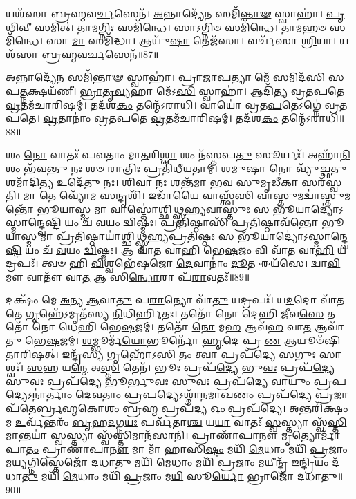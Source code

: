𑌯𑌶᳴𑌸𑌾 𑌬𑍍𑌰𑌹𑍍𑌮𑌵\-\ul{𑌰𑍍𑌚}\-𑌸𑍇𑌨᳴। 
\-\ul{𑌅}\-𑌨𑍍𑌨𑌾𑌦𑍍𑌯𑍇᳴\-\ul{𑌨} 𑌸𑌮𑌿᳴\-\ul{𑌨𑍍𑌤𑌾}\-\-\ul{𑍟} 𑌸𑍍𑌵𑌾𑌹𑌾॑। 
\-\ul{𑌪𑍃}\-\-\ul{𑌥𑌿}\-𑌵𑍀 \ul{𑌸}\-𑌮𑌿𑌤𑍍। 
𑌤𑌾\-\ul{𑌮}\-𑌗𑍍𑌨𑌿𑌃 𑌸𑌮𑌿᳴𑌨𑍍𑌧𑍇। 
𑌸𑌾𑌽𑌗𑍍𑌨𑌿𑍞 𑌸𑌮𑌿᳴𑌨𑍍𑌧𑍇। 
𑌤𑌾\-\ul{𑌮}\-𑌹𑍞 𑌸𑌮𑌿᳴𑌨𑍍𑌧𑍇। 
𑌸𑌾 \ul{𑌮𑌾} 𑌸𑌮𑌿᳴𑌦𑍍𑌧𑌾। 
𑌆𑌯𑍁᳴\-\ul{𑌷𑌾} 𑌤𑍇𑌜᳴𑌸𑌾। 
𑌵𑌰𑍍𑌚᳴𑌸𑌾 \ul{𑌶𑍍𑌰𑌿}\-𑌯𑌾। 
𑌯𑌶᳴𑌸𑌾 𑌬𑍍𑌰𑌹𑍍𑌮𑌵\-\ul{𑌰𑍍𑌚}\-𑌸𑍇𑌨᳴॥87॥

\-\ul{𑌅}\-𑌨𑍍𑌨𑌾𑌦𑍍𑌯𑍇᳴\-\ul{𑌨} 𑌸𑌮𑌿᳴\-\ul{𑌨𑍍𑌤𑌾}\-\-\ul{𑍟} 𑌸𑍍𑌵𑌾𑌹𑌾॑। 
\-\ul{𑌪𑍍𑌰𑌾}\-\-\ul{𑌜𑌾}\-\-\ul{𑌪}\-𑌤𑍍𑌯𑌾 𑌮𑍇᳴ \ul{𑌸}\-𑌮𑌿𑌦᳴𑌸𑌿 𑌸𑌪\-\ul{𑌤𑍍𑌨}\-𑌕𑍍𑌷𑌯᳴𑌣𑍀। 
\-\ul{𑌭𑍍𑌰𑌾}\-\-\ul{𑌤𑍃}\-\-\ul{𑌵𑍍𑌯}\-𑌹𑌾 𑌮𑍇᳴𑌽\-\ul{𑌸𑌿} 𑌸𑍍𑌵𑌾𑌹𑌾॑। 
𑌆𑌦𑌿᳴𑌤𑍍𑌯 𑌵𑍍𑌰𑌤𑌪𑌤𑍇 \ul{𑌵𑍍𑌰}\-𑌤𑌮᳴𑌚𑌾𑌰𑌿𑌷𑌮𑍍। 
𑌤𑌦᳴𑌶\-\ul{𑌕𑌂} 𑌤𑌨𑍍𑌮𑍇᳴𑌽𑌰𑌾𑌧𑌿। 
𑌵𑌾𑌯𑍋॑ 𑌵𑍍𑌰𑌤\-\ul{𑌪}\-𑌤𑍇𑌽𑌗𑍍𑌨𑍇॑ 𑌵𑍍𑌰𑌤𑌪𑌤𑍇। 
\-\ul{𑌵𑍍𑌰}\-𑌤𑌾𑌨𑌾𑌂॑ 𑌵𑍍𑌰𑌤𑌪𑌤𑍇 \ul{𑌵𑍍𑌰}\-𑌤𑌮᳴𑌚𑌾𑌰𑌿𑌷𑌮𑍍। 
𑌤𑌦᳴𑌶\-\ul{𑌕𑌂} 𑌤𑌨𑍍𑌮𑍇᳴𑌽𑌰𑌾𑌧𑌿॥88॥
\anuvakamend[\-\ul{𑌸}\-𑌮𑌿𑌥𑍍𑌸𑌮𑌿᳴𑌨𑍍𑌧𑍇 \ul{𑌵𑍍𑌰}\-𑌤𑌂 𑌚᳴𑌰𑌿\-\ul{𑌷𑍍𑌯𑌾}\-𑌮𑍍𑌯𑌾𑌯𑍁᳴\-\ul{𑌷𑌾} 𑌤𑍇𑌜᳴\-\ul{𑌸𑌾} 𑌵𑌰𑍍𑌚᳴𑌸𑌾 \ul{𑌶𑍍𑌰𑌿}\-𑌯𑌾 𑌯𑌶᳴𑌸𑌾 𑌬𑍍𑌰𑌹𑍍𑌮𑌵\-\ul{𑌰𑍍𑌚}\-𑌸𑍇\-\ul{𑌨𑌾}\-𑌷𑍍𑌟𑍗 𑌚᳴]


𑌶𑌂 \ul{𑌨𑍋} 𑌵𑌾𑌤𑌃᳴ 𑌪𑌵𑌤𑌾𑌂 𑌮𑌾\-\ul{𑌤}\-𑌰𑌿\-\ul{𑌶𑍍𑌵𑌾} 𑌶𑌂 𑌨᳴𑌸𑍍𑌤𑌪\-\ul{𑌤𑍁} 𑌸𑍂𑌰𑍍𑌯𑌃᳴। 
𑌅𑌹𑌾᳴\-\ul{𑌨𑌿}\-𑌶𑌂 𑌭᳴𑌵𑌨𑍍𑌤𑍁 \ul{𑌨𑌃} 𑌶𑍞 𑌰𑌾\-\ul{𑌤𑍍𑌰𑌿𑌃} 𑌪𑍍𑌰𑌤𑌿᳴𑌧𑍀𑌯𑌤𑌾𑌮𑍍। 
𑌶\-\ul{𑌮𑍁}\-𑌷𑌾 \ul{𑌨𑍋} 𑌵𑍍𑌯𑍁᳴𑌚𑍍𑌛\-\ul{𑌤𑍁} 𑌶𑌮𑌾᳴\-\ul{𑌦𑌿}\-𑌤𑍍𑌯 𑌉𑌦𑍇᳴𑌤𑍁 𑌨𑌃। 
\-\ul{𑌶𑌿}\-𑌵𑌾 \ul{𑌨𑌃} 𑌶𑌨𑍍𑌤᳴𑌮𑌾 𑌭𑌵 𑌸𑍁𑌮𑍃\-\ul{𑌡𑍀}\-𑌕𑌾 𑌸𑌰᳴𑌸𑍍𑌵𑌤𑌿। 
𑌮𑌾 \ul{𑌤𑍇} 𑌵𑍍𑌯𑍋᳴𑌮 \ul{𑌸}\-𑌨𑍍𑌦𑍃𑌶𑌿᳴। 
𑌇𑌡𑌾᳴\-\ul{𑌯𑍈} 𑌵𑌾𑌸𑍍𑌤𑍍𑌵᳴𑌸𑌿 𑌵𑌾\-\ul{𑌸𑍍𑌤𑍁}\-𑌮𑌦𑍍𑌵𑌾॑\-\ul{𑌸𑍍𑌤𑍁}\-𑌮𑌨𑍍𑌤𑍋᳴ 𑌭𑍂𑌯𑌾\-\ul{𑌸𑍍𑌮} 𑌮𑌾 𑌵𑌾𑌸𑍍𑌤𑍋॑𑌶𑍍𑌛𑌿𑌥𑍍𑌸𑍍𑌮𑌹𑍍𑌯\-\ul{𑌵𑌾}\-𑌸𑍍𑌤𑍁𑌃 𑌸 𑌭𑍂᳴\-\ul{𑌯𑌾}\-𑌦𑍍𑌯𑍋॑𑌽𑌸𑍍𑌮𑌾𑌨𑍍𑌦𑍍𑌵𑍇\-\ul{𑌷𑍍𑌟𑌿} 𑌯𑌂 𑌚᳴ \ul{𑌵}\-𑌯𑌂 \ul{𑌦𑍍𑌵𑌿}\-𑌷𑍍𑌮𑌃। 
\-\ul{𑌪𑍍𑌰}\-\-\ul{𑌤𑌿}\-𑌷𑍍𑌠𑌾𑌸𑌿᳴ 𑌪𑍍𑌰\-\ul{𑌤𑌿}\-𑌷𑍍𑌠𑌾𑌵᳴𑌨𑍍𑌤𑍋 𑌭𑍂𑌯𑌾\-\ul{𑌸𑍍𑌮} 𑌮𑌾 𑌪𑍍𑌰᳴\-\ul{𑌤𑌿}\-𑌷𑍍𑌠𑌾𑌯𑌾॑𑌶𑍍𑌛𑌿𑌥𑍍𑌸𑍍𑌮𑌹𑍍𑌯𑌪𑍍𑌰\-\ul{𑌤𑌿}\-𑌷𑍍𑌠𑌃 𑌸 𑌭𑍂᳴\-\ul{𑌯𑌾}\-𑌦𑍍𑌯𑍋॑𑌽𑌸𑍍𑌮𑌾𑌨𑍍𑌦𑍍𑌵𑍇\-\ul{𑌷𑍍𑌟𑌿} 𑌯𑌂 𑌚᳴ \ul{𑌵}\-𑌯𑌂 \ul{𑌦𑍍𑌵𑌿}\-𑌷𑍍𑌮𑌃। 
𑌆 𑌵𑌾᳴𑌤 𑌵𑌾𑌹𑌿 𑌭𑍇\-\ul{𑌷}\-𑌜𑌂 𑌵𑌿 𑌵𑌾᳴𑌤 𑌵𑌾\-\ul{𑌹𑌿} 𑌯𑌦𑍍𑌰𑌪𑌃᳴। 
𑌤𑍍𑌵𑍞 𑌹𑌿 \ul{𑌵𑌿}\-𑌶𑍍𑌵𑌭𑍇᳴𑌷𑌜𑍋 \ul{𑌦𑍇}\-𑌵𑌾𑌨𑌾𑌂॑ \ul{𑌦𑍂}\-𑌤 𑌈𑌯᳴𑌸𑍇। 
𑌦𑍍𑌵𑌾\-\ul{𑌵𑌿}\-𑌮𑍗 𑌵𑌾𑌤𑍗᳴ 𑌵𑌾\-\ul{𑌤} 𑌆 𑌸𑌿\-\ul{𑌨𑍍𑌧𑍋}\-𑌰𑌾 𑌪᳴\-\ul{𑌰𑌾}\-𑌵𑌤𑌃᳴॥89॥

𑌦𑌕𑍍𑌷𑌂᳴ 𑌮𑍇 \ul{𑌅}\-𑌨𑍍𑌯 \ul{𑌆}\-𑌵𑌾\-\ul{𑌤𑍁} 𑌪\-\ul{𑌰𑌾}\-𑌨𑍍𑌯𑍋 𑌵𑌾᳴\-\ul{𑌤𑍁} 𑌯𑌦𑍍𑌰𑌪𑌃᳴। 
𑌯\-\ul{𑌦}\-𑌦𑍋 𑌵𑌾᳴𑌤𑌤𑍇 \ul{𑌗𑍃}\-𑌹𑍇᳴𑌽𑌮𑍃𑌤᳴𑌸𑍍𑌯 \ul{𑌨𑌿}\-𑌧𑌿𑌰𑍍\mbox{}\-\ul{𑌹𑌿}\-𑌤𑌃। 
𑌤𑌤𑍋᳴ 𑌨𑍋 𑌦𑍇𑌹𑌿 \ul{𑌜𑍀}\-𑌵\-\ul{𑌸𑍇} 𑌤𑌤𑍋᳴ 𑌨𑍋 𑌧𑍇𑌹𑌿 𑌭𑍇\-\ul{𑌷}\-𑌜𑌮𑍍। 
𑌤𑌤𑍋᳴ \ul{𑌨𑍋} 𑌮\-\ul{𑌹} 𑌆𑌵᳴\-\ul{𑌹} 𑌵𑌾\-\ul{𑌤} 𑌆𑌵𑌾᳴𑌤𑍁 𑌭𑍇\-\ul{𑌷}\-𑌜𑌮𑍍। 
\-\ul{𑌶}\-𑌮𑍍𑌭𑍂𑌰𑍍𑌮᳴\-\ul{𑌯𑍋}\-𑌭𑍂𑌰𑍍𑌨𑍋᳴ \ul{𑌹𑍃}\-𑌦𑍇 𑌪𑍍𑌰 \ul{𑌣} 𑌆𑌯𑍂𑍞᳴𑌷𑌿 𑌤𑌾𑌰𑌿𑌷𑌤𑍍। 
𑌇𑌨𑍍𑌦𑍍𑌰᳴𑌸𑍍𑌯 \ul{𑌗𑍃}\-𑌹𑍋᳴𑌽\-\ul{𑌸𑌿} 𑌤𑌂 \ul{𑌤𑍍𑌵𑌾} 𑌪𑍍𑌰𑌪᳴\-\ul{𑌦𑍍𑌯𑍇} 𑌸\-\ul{𑌗𑍁𑌃} 𑌸𑌾𑌶𑍍𑌵𑌃᳴। 
\-\ul{𑌸}\-𑌹 𑌯\-\ul{𑌨𑍍𑌮𑍇} 𑌅\-\ul{𑌸𑍍𑌤𑌿} 𑌤𑍇𑌨᳴। 
𑌭𑍂𑌃 𑌪𑍍𑌰𑌪᳴\-\ul{𑌦𑍍𑌯𑍇} 𑌭𑍁\-\ul{𑌵𑌃} 𑌪𑍍𑌰𑌪᳴\-\ul{𑌦𑍍𑌯𑍇} 𑌸𑍁\-\ul{𑌵𑌃} 𑌪𑍍𑌰𑌪᳴\-\ul{𑌦𑍍𑌯𑍇} 𑌭𑍂𑌰𑍍𑌭𑍁\-\ul{𑌵𑌃} 𑌸𑍁\-\ul{𑌵𑌃} 𑌪𑍍𑌰𑌪᳴𑌦𑍍𑌯𑍇 \ul{𑌵𑌾}\-𑌯𑍁𑌂 𑌪𑍍𑌰\-\ul{𑌪}\-𑌦𑍍𑌯𑍇𑌽𑌨𑌾॑𑌰𑍍𑌤𑌾𑌂 \ul{𑌦𑍇}\-𑌵\-\ul{𑌤𑌾𑌂} 𑌪𑍍𑌰\-\ul{𑌪}\-𑌦𑍍𑌯𑍇𑌽𑌶𑍍𑌮𑌾᳴𑌨𑌮𑌾\-\ul{𑌖}\-𑌣𑌂 𑌪𑍍𑌰𑌪᳴𑌦𑍍𑌯𑍇 \ul{𑌪𑍍𑌰}\-𑌜𑌾𑌪᳴𑌤𑍇𑌰𑍍𑌬𑍍𑌰𑌹𑍍𑌮\-\ul{𑌕𑍋}\-𑌶𑌂 𑌬𑍍𑌰\-\ul{𑌹𑍍𑌮} 𑌪𑍍𑌰𑌪᳴\-\ul{𑌦𑍍𑌯} 𑌓𑌂 𑌪𑍍𑌰𑌪᳴𑌦𑍍𑌯𑍇। 
\-\ul{𑌅}\-𑌨𑍍𑌤𑌰𑌿᳴𑌕𑍍𑌷𑌂 𑌮 \ul{𑌉}\-𑌰𑍍𑌵᳴𑌨𑍍𑌤𑌰𑌂᳴ \ul{𑌬𑍃}\-𑌹\-\ul{𑌦}\-𑌗𑍍𑌨\-\ul{𑌯𑌃} 𑌪𑌰𑍍𑌵᳴𑌤𑌾\-\ul{𑌶𑍍𑌚} 𑌯\-\ul{𑌯𑌾} 𑌵𑌾𑌤𑌃᳴ \ul{𑌸𑍍𑌵}\-𑌸𑍍𑌤𑍍𑌯𑌾 𑌸𑍍𑌵᳴\-\ul{𑌸𑍍𑌤𑌿}\-𑌮𑌾𑌨𑍍𑌤𑌯𑌾॑ \ul{𑌸𑍍𑌵}\-𑌸𑍍𑌤𑍍𑌯𑌾 𑌸𑍍𑌵᳴\-\ul{𑌸𑍍𑌤𑌿}\-𑌮𑌾𑌨᳴𑌸𑌾𑌨𑌿। 
𑌪𑍍𑌰𑌾𑌣𑌾᳴𑌪𑌾𑌨𑍗 \ul{𑌮𑍃}\-𑌤𑍍𑌯𑍋𑌰𑍍𑌮𑌾᳴ 𑌪𑌾\-\ul{𑌤𑌂} 𑌪𑍍𑌰𑌾𑌣𑌾᳴𑌪𑌾\-\ul{𑌨𑍗} 𑌮𑌾 𑌮𑌾᳴ 𑌹𑌾𑌸𑌿\-\ul{𑌷𑍍𑌟𑌂} 𑌮𑌯𑌿᳴ \ul{𑌮𑍇}\-𑌧𑌾𑌂 𑌮𑌯𑌿᳴ \ul{𑌪𑍍𑌰}\-𑌜𑌾𑌂 𑌮\-\ul{𑌯𑍍𑌯}\-𑌗𑍍𑌨𑌿𑌸𑍍𑌤𑍇𑌜𑍋᳴ 𑌦𑌧𑌾\-\ul{𑌤𑍁} 𑌮𑌯𑌿᳴ \ul{𑌮𑍇}\-𑌧𑌾𑌂 𑌮𑌯𑌿᳴ \ul{𑌪𑍍𑌰}\-𑌜𑌾𑌂 𑌮𑌯𑍀𑌨𑍍𑌦𑍍𑌰᳴ 𑌇\-\ul{𑌨𑍍𑌦𑍍𑌰𑌿}\-𑌯𑌂 𑌦᳴𑌧𑌾\-\ul{𑌤𑍁} 𑌮𑌯𑌿᳴ \ul{𑌮𑍇}\-𑌧𑌾𑌂 𑌮𑌯𑌿᳴ \ul{𑌪𑍍𑌰}\-𑌜𑌾𑌂 𑌮\-\ul{𑌯𑌿} 𑌸𑍂\-\ul{𑌰𑍍𑌯𑍋} 𑌭𑍍𑌰𑌾𑌜𑍋᳴ 𑌦𑌧𑌾𑌤𑍁॥90॥


